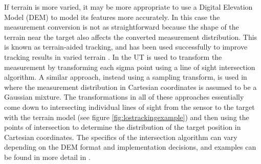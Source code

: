 \documentclass[journal]{IEEEtran}
\begin{document}
If terrain is more varied, it may be more appropriate to use a Digital Elevation Model (DEM) to model its features more accurately. In this case the measurement conversion is not as straightforward because the shape of the terrain near the target also affects the converted measurement distribution. This is known as terrain-aided tracking, and has been used successfully to improve tracking results in varied terrain \cite{collins1989terrain, kim2009terrain, schonborn2022terrain}. In \cite{collins1989terrain} the UT is used to transform the measurement by transforming each sigma point using a line of sight intersection algorithm. A similar approach, instead using a sampling transform, is used in \cite{schonborn2022terrain} where the measurement distribution in Cartesian coordinates is assumed to be a Gaussian mixture. The transformations in all of these approaches essentially come down to intersecting individual lines of sight from the sensor to the target with the terrain model (see figure \ref{fig:lostrackingexample}) and then using the points of intersection to determine the distribution of the target position in Cartesian coordinates. The specifics of the intersection algorithm can vary depending on the DEM format and implementation decisions, and examples can be found in more detail in \cite{collins1989terrain, kim2009terrain, schonborn2022terrain}.
\end{document}
